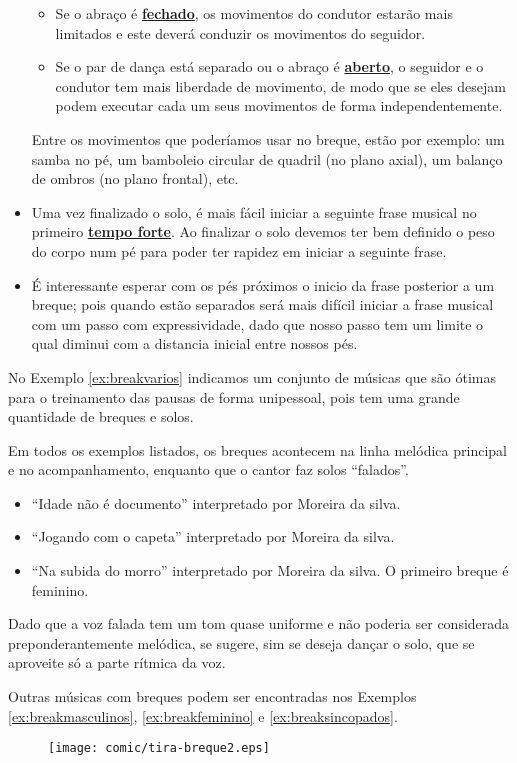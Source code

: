 \begin{itemize}
\begin{itemize}
\item Se o abraço é \hyperref[def:closed-position]{\textbf{fechado}}, os movimentos do condutor estarão mais limitados 
e este deverá conduzir os movimentos do seguidor.
\item Se o par de dança está separado ou o abraço é \hyperref[def:closed-position]{\textbf{aberto}}, 
o seguidor e o condutor tem mais liberdade de movimento, 
de modo que se eles desejam podem executar cada um seus movimentos de forma independentemente.
\end{itemize}
Entre os movimentos que poderíamos usar no breque, estão por exemplo: 
um samba no pé, um bamboleio circular de quadril (no plano axial), um balanço de ombros (no plano frontal), etc. 
\item Uma vez finalizado o solo, é mais fácil iniciar a seguinte frase musical
no primeiro \hyperref[subsec:perceberTF1]{\textbf{tempo forte}}. 
Ao finalizar o solo devemos ter bem definido o peso do corpo num pé 
para poder ter rapidez em iniciar a seguinte frase.
\item É interessante esperar com os pés próximos o inicio da frase posterior a um breque; 
pois quando estão separados será mais difícil iniciar a frase musical com um passo com expressividade,
dado que nosso passo tem um limite o qual diminui com a distancia inicial entre nossos pés.
\end{itemize}

No Exemplo \ref{ex:breakvarios} indicamos um conjunto de músicas 
que são ótimas para o treinamento das pausas de forma unipessoal,
pois tem uma grande quantidade de breques e solos.
\begin{example}
\label{ex:breakvarios}
Em todos os exemplos listados, os breques acontecem na linha melódica principal e no acompanhamento,
enquanto que o cantor faz solos ``falados''.
\begin{itemize}
\item ``Idade não é documento'' interpretado por Moreira da silva.
\item ``Jogando com o capeta'' interpretado por Moreira da silva.
\item ``Na subida do morro'' interpretado por Moreira da silva. 
O primeiro breque é feminino.
\end{itemize}
Dado que a voz falada tem um tom quase uniforme e não poderia ser considerada preponderantemente melódica,
se sugere, sim se deseja dançar o solo, que se aproveite só a parte rítmica da voz.
\end{example}

Outras músicas com breques podem ser encontradas nos Exemplos \ref{ex:breakmasculinos},
\ref{ex:breakfeminino} e 
\ref{ex:breaksincopados}.

\begin{figure}[h]
    \centering
    \texttt{[image: comic/tira-breque2.eps]}
\end{figure}

